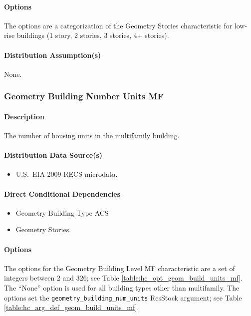 \paragraph{Options}
The options are a categorization of the Geometry Stories characteristic for low-rise buildings (1 story, 2 stories, 3 stories, 4+ stories).

\paragraph{Distribution Assumption(s)}
None.

\subsubsection{Geometry Building Number Units MF}
\paragraph{Description}
The number of housing units in the multifamily building.

\paragraph{Distribution Data Source(s)}
\begin{itemize}
    \item U.S.~EIA 2009 RECS microdata.
\end{itemize}

\paragraph{Direct Conditional Dependencies}
\begin{itemize}
    \item Geometry Building Type ACS
    \item Geometry Stories.
\end{itemize}

\paragraph{Options}
The options for the Geometry Building Level MF characteristic are a set of integers between 2 and 326; see Table \ref{table:hc_opt_geom_build_units_mf}. The ``None'' option is used for all building types other than multifamily. The options set the \texttt{geometry\_building\_num\_units} ResStock argument; see Table \ref{table:hc_arg_def_geom_build_units_mf}.

